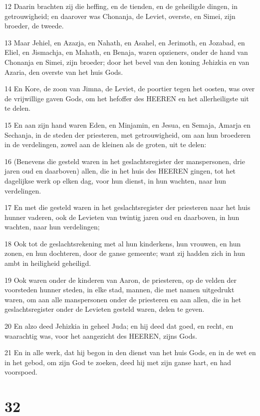 \par 12 Daarin brachten zij die heffing, en de tienden, en de geheiligde dingen, in getrouwigheid; en daarover was Chonanja, de Leviet, overste, en Simei, zijn broeder, de tweede.
\par 13 Maar Jehiel, en Azazja, en Nahath, en Asahel, en Jerimoth, en Jozabad, en Eliel, en Jismachja, en Mahath, en Benaja, waren opzieners, onder de hand van Chonanja en Simei, zijn broeder; door het bevel van den koning Jehizkia en van Azaria, den overste van het huis Gods.
\par 14 En Kore, de zoon van Jimna, de Leviet, de poortier tegen het oosten, was over de vrijwillige gaven Gods, om het hefoffer des HEEREN en het allerheiligste uit te delen.
\par 15 En aan zijn hand waren Eden, en Minjamin, en Jesua, en Semaja, Amarja en Sechanja, in de steden der priesteren, met getrouwigheid, om aan hun broederen in de verdelingen, zowel aan de kleinen als de groten, uit te delen:
\par 16 (Benevens die gesteld waren in het geslachtsregister der manspersonen, drie jaren oud en daarboven) allen, die in het huis des HEEREN gingen, tot het dagelijkse werk op elken dag, voor hun dienst, in hun wachten, naar hun verdelingen.
\par 17 En met die gesteld waren in het geslachtsregister der priesteren naar het huis hunner vaderen, ook de Levieten van twintig jaren oud en daarboven, in hun wachten, naar hun verdelingen;
\par 18 Ook tot de geslachtsrekening met al hun kinderkens, hun vrouwen, en hun zonen, en hun dochteren, door de ganse gemeente; want zij hadden zich in hun ambt in heiligheid geheiligd.
\par 19 Ook waren onder de kinderen van Aaron, de priesteren, op de velden der voorsteden hunner steden, in elke stad, mannen, die met namen uitgedrukt waren, om aan alle manspersonen onder de priesteren en aan allen, die in het geslachtsregister onder de Levieten gesteld waren, delen te geven.
\par 20 En alzo deed Jehizkia in geheel Juda; en hij deed dat goed, en recht, en waarachtig was, voor het aangezicht des HEEREN, zijns Gods.
\par 21 En in alle werk, dat hij begon in den dienst van het huis Gods, en in de wet en in het gebod, om zijn God te zoeken, deed hij met zijn ganse hart, en had voorspoed.

\chapter{32}

